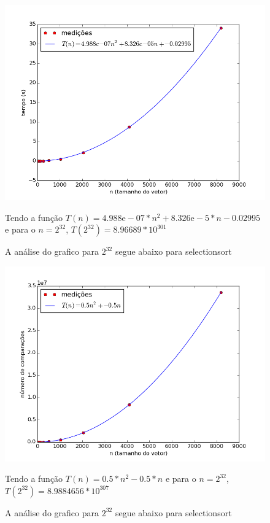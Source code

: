 \documentclass[12pt,a4paper,twoside]{report}
\begin{document}


\begin{figure}[ht]
\centering \includegraphics[scale=0.8]{../selectionsort/imagens/selectionsortQuaseCresc400.png}
\caption{A análise do grafico para $2^{32}$ segue abaixo para selectionsort}

Tendo a função $T(n) = 4.988\mathrm{e}-07*n^{2}+8.326\mathrm{e}-5*n-0.02995$ e para o $n =2^{32}$, $T(2^{32}) = 8.96689*10^{301}$
\label{fig:selectionsortQuaseCresc300}
\label{fig:selectionsortQuaseCresc400}
\end{figure}

\begin{figure}[ht]
\centering \includegraphics[scale=0.8]{../selectionsort/imagens/selectionsortQuaseCresc401.png}
\caption{A análise do grafico para $2^{32}$ segue abaixo para selectionsort}

Tendo a função $T(n) = 0.5*n^{2}-0.5*n$ e para o $n =2^{32}$, $T(2^{32}) =8.9884656 * 10^{307}$
\label{fig:selectionsortQuaseCresc401}
\end{figure}
\end{document}
